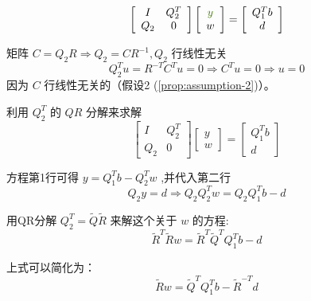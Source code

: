 \begin{equation}\displaystyle \left[\begin{array}{ c c }
    I & Q_{2}^{T}\\
    Q_{2} & 0
    \end{array}\right]\left[\begin{array}{ c }
    \textcolor[rgb]{0.25,0.46,0.02}{y}\\
    w
    \end{array}\right] =\left[\begin{array}{ c }
    Q_{1}^{T} b\\
    d
    \end{array}\right]\end{equation}


矩阵 $ C=Q_{2} R \Rightarrow Q_{2}=C R^{-1}, Q_{2} $ 行线性无关
\begin{equation}
Q_{2}^{T} u=R^{-T} C^{T} u=0  \Rightarrow  C^{T} u=0 \Rightarrow  u=0
\end{equation}
因为 $ C $ 行线性无关的（假设2 (\ref{prop:assumption-2})）。

利用 $ Q_{2}^{T} $ 的 $ Q R $ 分解来求解
\begin{equation}
\left[\begin{array}{cc}
I & Q_{2}^{T} \\
Q_{2} & 0
\end{array}\right]\left[\begin{array}{l}
y \\
w
\end{array}\right]=\left[\begin{array}{c}
Q_{1}^{T} b \\
d
\end{array}\right]
\end{equation}

方程第1行可得 $ y=Q_{1}^{T} b-Q_{2}^{T} w $ ,并代入第二行
\begin{equation}
Q_{2} y=d \Rightarrow Q_{2} Q_{2}^{T} w=Q_{2} Q_{1}^{T} b-d
\end{equation}

用QR分解 $ Q_{2}^{T}=\tilde{Q} \tilde{R} $ 来解这个关于 $ w $ 的方程:
\begin{equation}
\tilde{R}^{T} \tilde{R} w=\tilde{R}^{T} \tilde{Q}^{T} Q_{1}^{T} b-d
\end{equation}

上式可以简化为：
\begin{equation}
\tilde{R} w=\tilde{Q}^{T} Q_{1}^{T} b-\tilde{R}^{-T} d
\end{equation}

